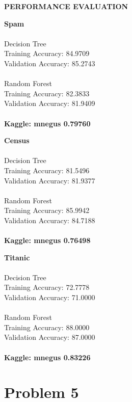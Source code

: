 \documentclass{report}
\newcommand{\tab}{\-\hspace{0.5cm}}
\begin{document}
\textbf{PERFORMANCE EVALUATION}

\begin{multicols}{3}
\textbf{Spam}\\
\-\\
Decision Tree\\
\tab Training Accuracy:   84.9709 \\
\tab Validation Accuracy:   85.2743 \\
\-\\
Random Forest\\
\tab Training Accuracy:   82.3833 \\
\tab Validation Accuracy:   81.9409 \\
\-\\
\textbf{Kaggle: mnegus 0.79760}\\
\columnbreak

\textbf{Census}\\
\-\\
Decision Tree\\
\tab Training Accuracy:   81.5496 \\
\tab Validation Accuracy:   81.9377 \\
\-\\
Random Forest\\
\tab Training Accuracy:   85.9942 \\
\tab Validation Accuracy:   84.7188 \\
\-\\
\textbf{Kaggle: mnegus 0.76498}\\
\columnbreak

\textbf{Titanic}\\
\-\\
Decision Tree\\
\tab Training Accuracy:   72.7778 \\
\tab Validation Accuracy:   71.0000\\
\-\\
Random Forest\\
\tab Training Accuracy:   88.0000 \\
\tab Validation Accuracy:   87.0000\\
\-\\
\textbf{Kaggle: mnegus 0.83226}

\end{multicols}


\newpage
\section*{Problem 5}
\end{document}
